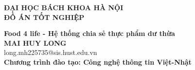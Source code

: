\documentclass[main.tex]{subfiles}
\begin{document}
\begin{titlepage}
\thispagestyle{empty}
\begin{center}

{\textbf{\large{ĐẠI HỌC BÁCH KHOA HÀ NỘI}}}\\[4cm]

{\textbf{\huge{ ĐỒ ÁN TỐT NGHIỆP}}}\\[1cm]
{\textbf{\Large{Food 4 life - Hệ thống chia sẻ thực phẩm dư
thừa}}\\[1cm]

{\textbf{\large{MAI HUY LONG}}}\\
{\large{long.mh225735@sis.hust.edu.vn}}\\[0.5cm]

{\textbf{\large{Chương trình đào tạo: Công nghệ thông tin Việt-Nhật
}}}\\

\vspace{4cm}
\begin{table}[H]
\centering
{}
\end{table}}
\end{center}



\end{titlepage}
\end{document}
